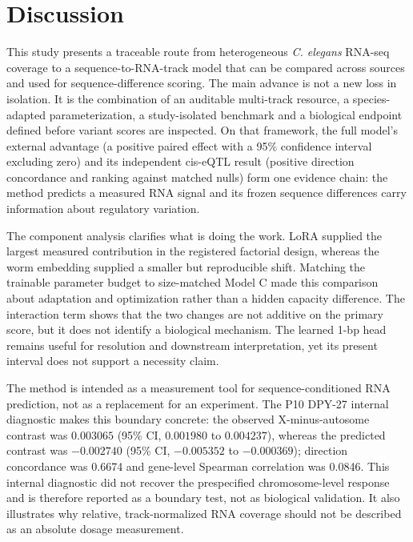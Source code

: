 \documentclass[pdflatex,sn-nature]{sn-jnl}
\newcommand{\ExtPrimary}{a positive paired effect with a 95\% confidence interval excluding zero}
\newcommand{\ExtVariant}{positive direction concordance and ranking against matched nulls}
\begin{document}
\section{Discussion}\label{sec:discussion}

This study presents a traceable route from heterogeneous \textit{C. elegans}
RNA-seq coverage to a sequence-to-RNA-track model that can be compared across
sources and used for sequence-difference scoring. The main advance is not a
new loss in isolation. It is the combination of an auditable multi-track
resource, a species-adapted parameterization, a study-isolated benchmark and a
biological endpoint defined before variant scores are inspected. On that
framework, the full model's external advantage (\ExtPrimary) and its independent
cis-eQTL result (\ExtVariant) form one evidence chain: the method predicts a
measured RNA signal and its frozen sequence differences carry information about
regulatory variation.

The component analysis clarifies what is doing the work. LoRA supplied the
largest measured contribution in the registered factorial design, whereas the
worm embedding supplied a smaller but reproducible shift. Matching the
trainable parameter budget to size-matched Model C made this comparison about adaptation and
optimization rather than a hidden capacity difference. The interaction term
shows that the two changes are not additive on the primary score, but it does
not identify a biological mechanism. The learned 1-bp head remains useful for
resolution and downstream interpretation, yet its present interval does not
support a necessity claim.

The method is intended as a measurement tool for sequence-conditioned RNA
prediction, not as a replacement for an experiment. The P10 DPY-27 internal
diagnostic makes this boundary concrete: the observed X-minus-autosome
contrast was \(0.003065\) (95\% CI, \(0.001980\) to \(0.004237\)), whereas the
predicted contrast was \(-0.002740\) (95\% CI, \(-0.005352\) to \(-0.000369\));
direction concordance was 0.6674 and gene-level Spearman correlation was 0.0846.
This internal diagnostic did not recover the prespecified chromosome-level
response and is therefore reported as a boundary test, not as biological
validation. It also illustrates why relative, track-normalized RNA coverage
should not be described as an absolute dosage measurement.
\end{document}
